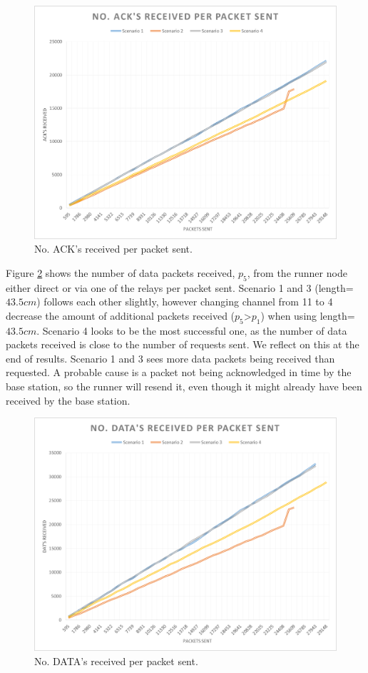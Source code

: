 \begin{figure}[h]
	\centering
	\includegraphics[width=1\linewidth]{results/NoAckReceived}
	\caption{No. ACK's received per packet sent.}
	\label{fig:noackreceived}
\end{figure}

\noindent Figure \ref{fig:nodatareceived} shows the number of data packets received, $p_5$, from the runner node either direct or via one of the relays per packet sent. Scenario 1 and 3 (length=$43.5cm$) follows each other slightly, however changing channel from 11 to 4 decrease the amount of additional packets received ($p_5$>$p_1$) when using length=$43.5cm$. Scenario 4 looks to be the most successful one, as the number of data packets received is close to the number of requests sent. We reflect on this at the end of results. Scenario 1 and 3 sees more data packets being received than requested. A probable cause is a packet not being acknowledged in time by the base station, so the runner will resend it, even though it might already have been received by the base station.

\begin{figure}[h]
	\centering
	\includegraphics[width=1\linewidth]{results/NoDataReceived}
	\caption{No. DATA's received per packet sent.}
	\label{fig:nodatareceived}
\end{figure}

